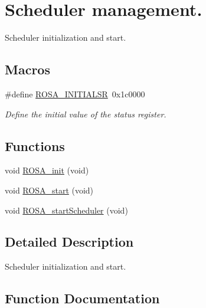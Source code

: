 \hypertarget{group__rosa__kernel__sm}{}\section{Scheduler management.}
\label{group__rosa__kernel__sm}


Scheduler initialization and start.  


\subsection*{Macros}
\begin{DoxyCompactItemize}
\item 
\hypertarget{group__rosa__kernel__sm_gaf4c28a200166f46384b123c7be151e77}{}\#define \hyperlink{group__rosa__kernel__sm_gaf4c28a200166f46384b123c7be151e77}{R\+O\+S\+A\+\_\+\+I\+N\+I\+T\+I\+A\+L\+S\+R}~0x1c0000\label{group__rosa__kernel__sm_gaf4c28a200166f46384b123c7be151e77}

\begin{DoxyCompactList}\small\item\em Define the initial value of the status register. \end{DoxyCompactList}\end{DoxyCompactItemize}
\subsection*{Functions}
\begin{DoxyCompactItemize}
\item 
void \hyperlink{group__rosa__kernel__sm_ga83eda3bb4fb3a94dea3894a596a662e6}{R\+O\+S\+A\+\_\+init} (void)
\item 
void \hyperlink{group__rosa__kernel__sm_ga299c2721dc32b54f2acb881cf98bc13d}{R\+O\+S\+A\+\_\+start} (void)
\item 
void \hyperlink{group__rosa__kernel__sm_gaa7bf5f9ee0c2f711b8adeec7c816f44a}{R\+O\+S\+A\+\_\+start\+Scheduler} (void)
\end{DoxyCompactItemize}


\subsection{Detailed Description}
Scheduler initialization and start. 



\subsection{Function Documentation}
\hypertarget{group__rosa__kernel__sm_ga83eda3bb4fb3a94dea3894a596a662e6}{}
